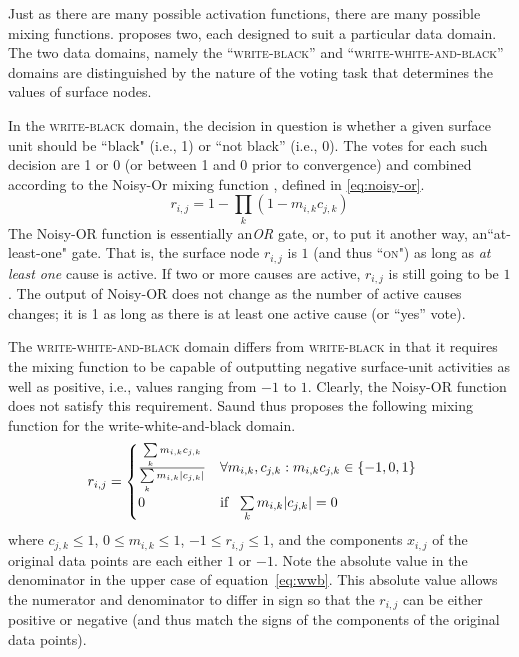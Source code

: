 Just as there are many possible activation functions, there are many 
possible mixing functions.
\citet{saund:94} proposes two, each designed 
to suit a particular data domain.  The two data domains, namely 
the ``\textsc{write-black}'' and ``\textsc{write-white-and-black}'' 
domains are distinguished by the nature of the voting task that 
determines the values of surface nodes. 

 In the \textsc{write-black} domain, the decision in question is 
 whether a given surface unit should be ``black" (i.e., 1) or ``not black'' (i.e., 0). 
 The votes for each such decision are 1 or 0 (or between 1 and 0 prior to convergence) 
 and combined according to the  Noisy-Or mixing function \citep{pearl:1988}, 
 defined in \eqref{eq:noisy-or}.
\begin{equation}\label{eq:noisy-or}
r_{i,j} = 1 - \prod\limits_{k} (1 - m_{i,k} c_{j,k})
\end{equation}
 The Noisy-OR function is essentially an\textit{OR} gate, or, to put it another way, 
 an``at-least-one" gate. That is, the surface node $r_{i,j}$ is $1$ (and thus ``\textsc{on}") as long as 
 \emph{at least one} cause is active.
 If two or more causes are active,
$r_{i,j}$ is still going to be $1$. The output of Noisy-OR does not change 
as the number of active causes changes; it is 1 as long as there is at least one active cause (or ``yes'' vote).

The \textsc{write-white-and-black} domain differs from \textsc{write-black} 
in that it requires the mixing function to be capable of outputting negative surface-unit 
activities as well as positive, i.e., values ranging from $-1$ to $1$.
Clearly, the Noisy-OR function does not satisfy this requirement.
Saund thus proposes the following mixing function for the {write-white-and-black} domain.
 \begin{align}\label{eq:wwb}
  r_{i,j} &=
    \begin{cases}
      \frac{\sum\limits_{k} m_{i,k} c_{j,k}}{\sum\limits_{k} m_{i,k} |c_{j,k}|} & \text{$\forall m_{i,k}, c_{j,k} : m_{i,k} c_{j,k} \in \{-1,0,1\} $}\\ 
      0 & \text{if \, $\sum\limits_{k} m_{i,k} |c_{j,k}|= 0$} 
    \end{cases}
 \end{align}
where $c_{j,k} \leq 1$, $0 \leq  m_{i,k} \leq  1$,  $-1 \leq  r_{i,j} \leq  1$, 
and the components $x_{i,j}$ of the original data points
are each either $1$ or  $-1$. Note the absolute value in the denominator in the upper case of equation~\eqref{eq:wwb}. 
This absolute value allows the numerator and denominator to differ in sign so that 
the $r_{i,j}$ can be either positive or negative (and thus match the signs of the components of the original data points).

